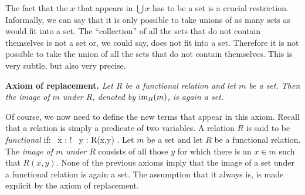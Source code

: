 \br
The fact that the $x$ that appears in $\bigcup x$ has to be a set is a crucial restriction. Informally, we can say that it is only possible to take unions of as many sets as would fit into a set. The ``collection'' of all the sets that do not contain themselves is not a set or, we could say, does not fit into a set. Therefore it is not possible to take the union of all the sets that do not contain themselves. This is very subtle, but also very precise.
\er

\textbf{Axiom of replacement.} \emph{Let $R$ be a functional relation and let $m$ be a set. Then the image of $m$ under $R$, denoted by $\mathrm{im}_R (m)$, is again a set.}

Of course, we now need to define the new terms that appear in this axiom. Recall that a relation is simply a predicate of two variables.
\bd
A relation $R$ is said to be \emph{functional} if:
\bse
\forall \, x : \exists ! \, y : R(x,y) .
\ese
\ed
\bd
Let $m$ be a set and let $R$ be a functional relation. The \emph{image of $m$ under $R$} consists of all those $y$ for which there is an $x\in m$ such that $R(x,y)$. 
\ed
None of the previous axioms imply that the image of a set under a functional relation is again a set. The assumption that it always is, is made explicit by the axiom of replacement.

